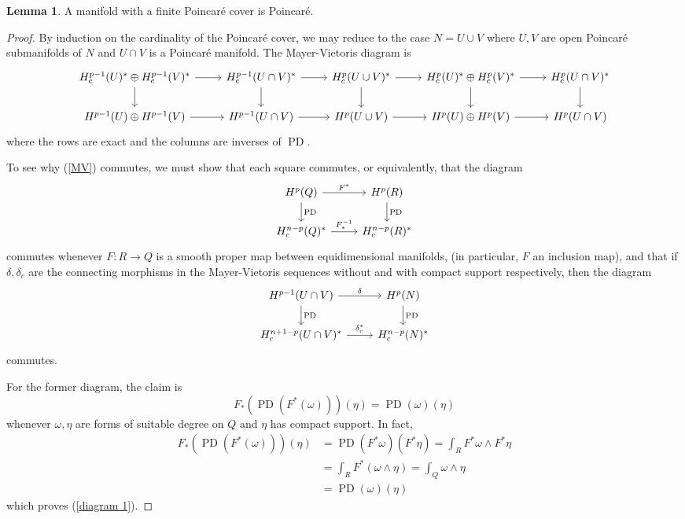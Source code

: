 \documentclass[10pt]{article}
\DeclareMathOperator{\PD}{PD}
\theoremstyle{definition}
\newtheorem{lemma}{Lemma}[exer]
\begin{document}
\begin{lemma}
\label{poincare covers}
A manifold with a finite Poincar\'e cover is Poincar\'e.
\end{lemma}
\begin{proof}
By induction on the cardinality of the Poincar\'e cover, we may reduce to the case $N = U \cup V$ where $U, V$ are open Poincar\'e submanifolds of $N$ and $U \cap V$ is a Poincar\'e manifold.
The Mayer-Vietoris diagram is
\begin{equation}
\label{MV}
\begin{tikzcd}
H^{p-1}_c(U)^* \oplus H^{p-1}_c(V)^* \arrow[r] \arrow[d] & H^{p-1}_c(U \cap V)^* \arrow[r] \arrow[d] & H^p_c(U \cup V)^* \arrow[r] \arrow[d] & H^p_c(U)^* \oplus H^p_c(V)^* \arrow[r] \arrow[d] & H^p_c(U \cap V)^* \arrow[d] \\
H^{p-1}(U) \oplus H^{p-1}(V) \arrow[r] & H^{p-1}(U \cap V) \arrow[r] & H^p(U \cup V) \arrow[r] & H^p(U) \oplus H^p(V) \arrow[r] & H^p(U \cap V)
\end{tikzcd}
\end{equation}
where the rows are exact and the columns are inverses of $\PD$.

To see why (\ref{MV}) commutes, we must show that each square commutes, or equivalently, that the diagram
$$\begin{tikzcd}
H^p(Q) \arrow[r,"F^*"] \arrow[d,"\PD"] & H^p(R) \arrow[d,"\PD"]\\
H^{n-p}_c(Q)^* \arrow[r,"F_*^{-1}"] & H^{n-p}_c(R)^*
\end{tikzcd}$$
commutes whenever $F: R \to Q$ is a smooth proper map between equidimensional manifolds, (in particular, $F$ an inclusion map), and that if $\delta, \delta_c$ are the connecting morphisms in the Mayer-Vietoris sequences without and with compact support respectively, then the diagram
$$\begin{tikzcd}
H^{p-1}(U \cap V) \arrow[r,"\delta"] \arrow[d,"\PD"] & H^p(N) \arrow[d,"\PD"]\\
H^{n+1-p}_c(U \cap V)^* \arrow[r,"\delta_c^*"] & H^{n-p}_c(N)^*
\end{tikzcd}$$
commutes.

For the former diagram, the claim is
\begin{equation}
\label{diagram 1}
F_*(\PD(F^*(\omega)))(\eta) = \PD(\omega)(\eta)
\end{equation}
whenever $\omega,\eta$ are forms of suitable degree on $Q$ and $\eta$ has compact support. In fact,
\begin{align*}
F_*(\PD(F^*(\omega)))(\eta) &= \PD(F^*\omega)(F^*\eta) = \int_R F^* \omega \wedge F^*\eta \\
&= \int_R F^*(\omega \wedge \eta) = \int_Q \omega \wedge \eta \\
&= \PD(\omega)(\eta)
\end{align*}
which proves (\ref{diagram 1}).


\end{proof}
\end{document}
